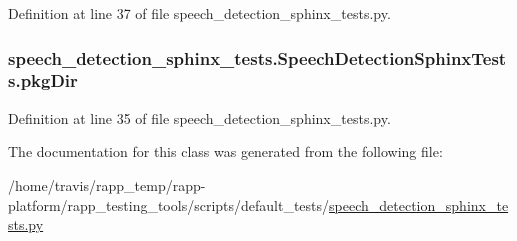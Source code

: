 Definition at line 37 of file speech\-\_\-detection\-\_\-sphinx\-\_\-tests.\-py.

\hypertarget{classspeech__detection__sphinx__tests_1_1SpeechDetectionSphinxTests_afd1a45b07c623d2a3ac4d5e393feecda}{
\subsubsection[{pkg\-Dir}]{\setlength{\rightskip}{0pt plus 5cm}speech\-\_\-detection\-\_\-sphinx\-\_\-tests.\-Speech\-Detection\-Sphinx\-Tests.\-pkg\-Dir}}\label{classspeech__detection__sphinx__tests_1_1SpeechDetectionSphinxTests_afd1a45b07c623d2a3ac4d5e393feecda}


Definition at line 35 of file speech\-\_\-detection\-\_\-sphinx\-\_\-tests.\-py.



The documentation for this class was generated from the following file\-:\begin{DoxyCompactItemize}
\item 
/home/travis/rapp\-\_\-temp/rapp-\/platform/rapp\-\_\-testing\-\_\-tools/scripts/default\-\_\-tests/\hyperlink{speech__detection__sphinx__tests_8py}{speech\-\_\-detection\-\_\-sphinx\-\_\-tests.\-py}\end{DoxyCompactItemize}
